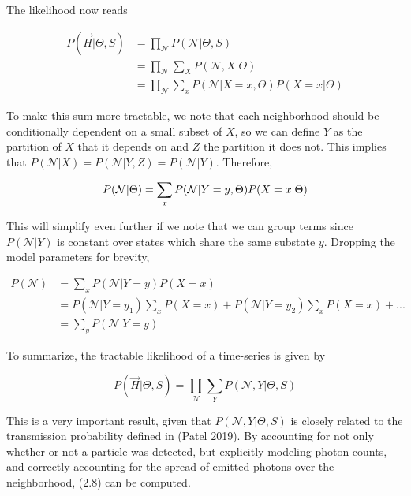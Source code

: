 \documentclass{ucetd}
\begin{document}
The likelihood now reads

\begin{align*}
P(\vec{H}|\Theta,S) &= \prod_{\mathcal{N}}P(\mathcal{N}|\Theta,S) \\
&= \prod_{\mathcal{N}}\sum_{X}P(\mathcal{N},X|\Theta) \\
&= \prod_{\mathcal{N}}\sum_{x}P(\mathcal{N}|X=x,\Theta)P(X=x|\Theta)
\end{align*}

To make this sum more tractable, we note that each neighborhood should be conditionally dependent on a small subset of $X$, so we can define $Y$ as the partition of $X$ that it depends on and $Z$ the partition it does not. This implies that $P(\mathcal{N}|X) = P(\mathcal{N}|Y,Z) = P(\mathcal{N}|Y)$. Therefore,


\begin{equation*}
P(\mathcal{N}|\Theta) = \sum_{x}P(\mathcal{N}|Y=y,\Theta)P(X=x|\Theta)\\
\end{equation*}

This will simplify even further if we note that we can group terms since $P(\mathcal{N}|Y)$ is constant over states which share the same substate $y$. Dropping the model parameters for brevity,

\begin{align*}
P(\mathcal{N}) &= \sum_{x}P(\mathcal{N}|Y=y)P(X=x)\\
&= P(\mathcal{N}|Y=y_{1})\sum_{x}P(X=x) +  P(\mathcal{N}|Y=y_{2})\sum_{x}P(X=x) + ... \\
&=  \sum_{y}P(\mathcal{N}|Y=y)
\end{align*}

To summarize, the tractable likelihood of a time-series is given by

\begin{equation}
P(\vec{H}|\Theta,S) = \prod_{\mathcal{N}}\sum_{Y}P(\mathcal{N},Y|\Theta,S)
\end{equation}

This is a very important result, given that $P(\mathcal{N},Y|\Theta,S)$ is closely related to the transmission probability defined in (Patel 2019). By accounting for not only whether or not a particle was detected, but explicitly modeling photon counts, and correctly accounting for the spread of emitted photons over the neighborhood, (2.8) can be computed.
\end{document}

